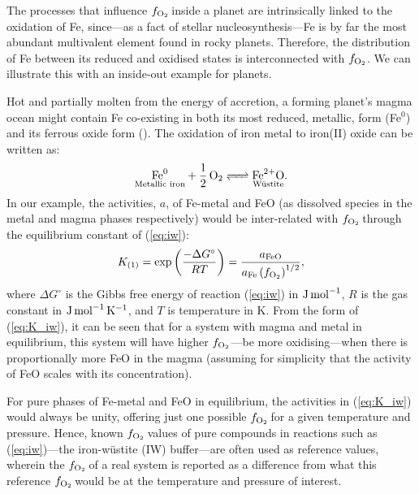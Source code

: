 \documentclass[fleqn,usenatbib,twocolumn]{mnras}
\newcommand{\fo}{$f_{\ce{O2}}$}
\newcommand{\todo}[1]{\textit{\textcolor{violet}{{#1}}}}
\begin{document}
The processes that influence \fo\,inside a planet are intrinsically linked to the oxidation of Fe, since---as a fact of stellar nucleosynthesis---Fe is by far the most abundant multivalent element found in rocky planets. Therefore, the distribution of Fe between its reduced and oxidised states is interconnected with \fo. We can illustrate this with an inside-out example for planets. 

Hot and partially molten from the energy of accretion, a forming planet's magma ocean might contain Fe co-existing in both its most reduced, metallic, form (Fe$^0$) and its ferrous oxide form (). The oxidation of iron metal to iron(II) oxide can be written as:
\begin{equation}\label{eq:iw}
\ce{ $\underset{\text{Metallic iron}}{\ce{Fe^0}}$ + \frac{1}{2} O2 <=> $\underset{\text{W\"ustite}}{\ce{Fe^{2+}O}}$ }.
\end{equation}
In our example, the activities, $a$, of Fe-metal and FeO (as dissolved species in the metal and magma phases respectively) would be inter-related with \fo\,through the equilibrium constant of (\ref{eq:iw}):
\begin{equation}\label{eq:K_iw}
K_{(1)} = \exp{\left(\frac{-\Delta G^\circ}{RT}\right)} = \frac{a_{\ce{FeO}}}{a_{\ce{Fe}}\left(f_{\ce{O2}}\right)^{1/2}},
\end{equation}
where $\Delta G^\circ$ is the Gibbs free energy of reaction (\ref{eq:iw}) in ${\rm J}\,{\rm mol}^{-1}$, $R$ is the gas constant in ${\rm J}\,{\rm mol}^{-1}\,{\rm K}^{-1}$, and $T$ is temperature in K. From the form of (\ref{eq:K_iw}), it can be seen that for a system with magma and metal in equilibrium, this system will have higher \fo---be more oxidising---when there is proportionally more FeO in the magma (assuming for simplicity that the activity of FeO scales with its concentration).

For pure phases of Fe-metal and FeO in equilibrium, the activities in (\ref{eq:K_iw}) would always be unity, offering just one possible \fo\,for a given temperature and pressure. Hence, known \fo\,values of pure compounds in reactions such as (\ref{eq:iw})---the iron-w\"ustite (IW) buffer---are often used as reference values, wherein the \fo\,of a real system is reported as a difference from what this reference \fo\,would be at the temperature and pressure of interest.  %
\end{document}
